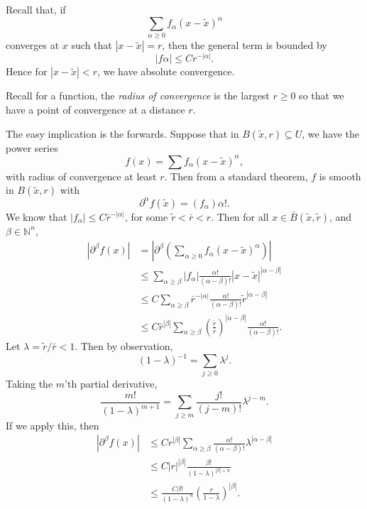 \documentclass[12pt]{article}
\begin{document}
\begin{proofbox}
	Recall that, if
	\[
	\sum_{\alpha \geq 0} f_\alpha (x - \tilde x)^\alpha
	\]
	converges at $x$ such that $|x - \tilde x| = r$, then the general term is bounded by
	\[
	|f\alpha| \leq Cr^{-|\alpha|}.
	\]
	Hence for $|x - \tilde x| < r$, we have absolute convergence.

	Recall for a function, the \emph{radius of convergence} is the largest $r \geq 0$ so that we have a point of convergence at a distance $r$.

	The easy implication is the forwards. Suppose that in $B(\tilde x, r) \subseteq U$, we have the power series
	\[
	f(x) = \sum f_\alpha (x - \tilde x)^\alpha,
	\]
	with radius of convergence at least $r$. Then from a standard theorem, $f$ is smooth in $B(\tilde x, r)$ with
	\[
	\partial^\alpha f(\tilde x) = (f_\alpha) \alpha!.
	\]
	We know that $|f_\alpha| \leq C \bar r^{-|\alpha|}$, for some $\tilde r < \bar r < r$. Then for all $x \in \bar B(\tilde x, \tilde r)$, and $\beta \in \mathbb{N}^n$,
	\begin{align*}
	|\partial^\beta f(x)| &= \left|\partial^\beta  \left( \sum_{\alpha \geq 0} f_\alpha (x - \tilde x)^\alpha \right) \right| \\
			      &\leq \sum_{\alpha \geq \beta} |f_\alpha| \frac{\alpha!}{(\alpha - \beta)!} |x - \tilde x|^{|\alpha - \beta|} \\
			      &\leq C \sum_{\alpha \geq \beta} \bar r^{-|\alpha|} \frac{\alpha!}{(\alpha - \beta)!} \tilde r^{|\alpha - \beta|} \\
			      &\leq C \bar r^{|\beta|} \sum_{\alpha \geq \beta} \left( \frac{\tilde r}{\bar r} \right)^{|\alpha - \beta|} \frac{\alpha!}{(\alpha - \beta)!}.
	\end{align*}
	Let $\lambda = \tilde r/ \bar r < 1$. Then by observation,
	\[
		(1 - \lambda)^{-1} = \sum_{j \geq 0} \lambda^{j}.
	\]
	Taking the $m$'th partial derivative,
	\[
	\frac{m!}{(1 - \lambda)^{m+1}} = \sum_{j \geq m} \frac{j!}{(j - m)!} \lambda^{j - m}.
	\]
	If we apply this, then
	\begin{align*}
		|\partial^\beta f(x)| & \leq C r^{|\beta|} \sum_{\alpha \geq \beta} \frac{\alpha!}{(\alpha - \beta)!} \lambda^{|\alpha - \beta|} \\
				      &\leq C |r|^{|\beta|} \frac{\beta!}{(1 - \lambda)^{|\beta| + n}} \\
				      &\leq \frac{C \beta!}{(1 - \lambda)^n} \left( \frac{r}{1 - \lambda} \right)^{|\beta|}.
	\end{align*}

\end{proofbox}
\end{document}
